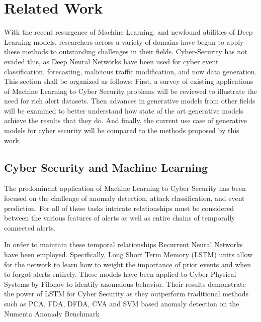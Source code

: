 %
%
%

\chapter{Related Work}

With the recent resurgence of Machine Learning, and newfound abilities of Deep Learning models, researchers across a variety of domains have begun to apply these methods to outstanding challenges in their fields. Cyber-Security has not evaded this, as Deep Neural Networks have been used for cyber event classification, forecasting, malicious traffic modification, and now data generation. This section shall be organized as follows: First, a survey of existing applications of Machine Learning to Cyber Security problems will be reviewed to illustrate the need for rich alert datasets. Then advances in generative models from other fields will be examined to better understand how state of the art generative models achieve the results that they do. And finally, the current use case of generative models for cyber security will be compared to the methods proposed by this work. 

\section{Cyber Security and Machine Learning}

The predominant application of Machine Learning to Cyber Security has been focused on the challenge of anomaly detection, attack classification, and event prediction. For all of these tasks intricate relationships must be considered between the various features of alerts as well as entire chains of temporally connected alerts. 

In order to maintain these temporal relationships Recurrent Neural Networks have been employed. Specifically, Long Short Term Memory (LSTM) units allow for the network to learn how to weight the importance of prior events and when to forgot alerts entirely. These models have been applied to Cyber Physical Systems by Filonov \etal to identify anomalous behavior. Their results demonstrate the power of LSTM for Cyber Security as they outperform traditional methods such as PCA, FDA, DFDA, CVA and SVM based anomaly detection \cite{Filonov2016, Filonov2017} on the Numenta Anomaly Benchmark \cite{Lavin2015}

